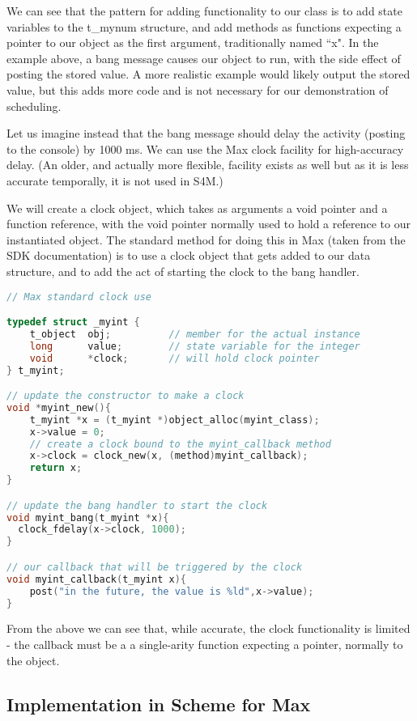 \documentclass[acmsmall]{acmart}
\begin{document}
We can see that the pattern for adding functionality to our class is to
add state variables to the t\_mynum structure, and add methods as
functions expecting a pointer to our object as the first argument,
traditionally named ``x". In the example above, a bang message causes our
object to run, with the side effect of posting the stored value. A more
realistic example would likely output the stored value, but this adds more code
and is not necessary for our demonstration of scheduling.

Let us imagine instead that the bang message should delay the activity
(posting to the console) by 1000 ms. We can use the Max clock facility for high-accuracy
delay. (An older, and actually more flexible, facility exists as well but as it is
less accurate temporally, it is not used in S4M.) 

We will create a clock object, which takes as arguments a void pointer and a function
reference, with the void pointer normally used to hold a reference to our instantiated
object. The standard method for doing this in Max (taken from the SDK documentation)
is to use a clock object that gets added to our data structure, and to add the act
of starting the clock to the bang handler.

\begin{lstlisting}[language=C]
// Max standard clock use

typedef struct _myint {
    t_object  obj;          // member for the actual instance 
    long      value;        // state variable for the integer
    void      *clock;       // will hold clock pointer
} t_myint;

// update the constructor to make a clock
void *myint_new(){
    t_myint *x = (t_myint *)object_alloc(myint_class);
    x->value = 0;
    // create a clock bound to the myint_callback method
    x->clock = clock_new(x, (method)myint_callback); 
    return x;
}

// update the bang handler to start the clock
void myint_bang(t_myint *x){
  clock_fdelay(x->clock, 1000);
}

// our callback that will be triggered by the clock
void myint_callback(t_myint x){
    post("in the future, the value is %ld",x->value);
}
\end{lstlisting}


From the above we can see that, while accurate, the clock functionality is limited -
the callback must be a a single-arity function expecting a pointer, normally to the object.


\subsection{Implementation in Scheme for Max}
\end{document}
